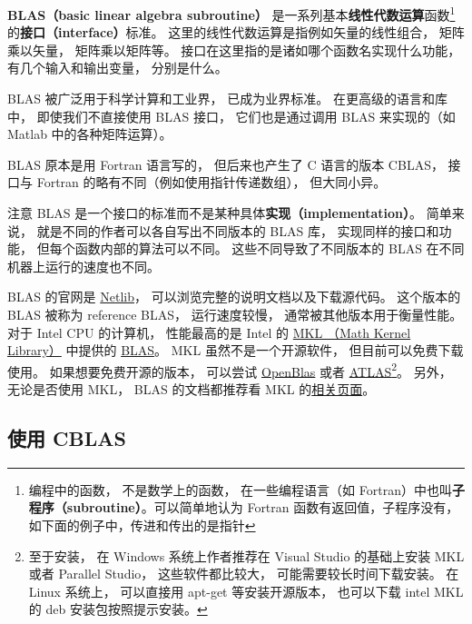 

\textbf{BLAS（basic linear algebra subroutine）} 是一系列基本\textbf{线性代数运算}函数\footnote{编程中的函数， 不是数学上的函数， 在一些编程语言（如 Fortran）中也叫\textbf{子程序（subroutine）}。可以简单地认为 Fortran 函数有返回值，子程序没有，如下面的例子中，传进和传出的是指针}的\textbf{接口（interface）}标准。  这里的线性代数运算是指例如矢量的线性组合， 矩阵乘以矢量， 矩阵乘以矩阵等。 接口在这里指的是诸如哪个函数名实现什么功能， 有几个输入和输出变量， 分别是什么。

BLAS 被广泛用于科学计算和工业界， 已成为业界标准。 在更高级的语言和库中， 即使我们不直接使用 BLAS 接口， 它们也是通过调用 BLAS 来实现的（如 Matlab 中的各种矩阵运算）。

BLAS 原本是用 Fortran 语言写的， 但后来也产生了 C 语言的版本 CBLAS， 接口与 Fortran 的略有不同（例如使用指针传递数组）， 但大同小异。

注意 BLAS 是一个接口的标准而不是某种具体\textbf{实现（implementation）}。 简单来说， 就是不同的作者可以各自写出不同版本的 BLAS 库， 实现同样的接口和功能， 但每个函数内部的算法可以不同。  这些不同导致了不同版本的 BLAS 在不同机器上运行的速度也不同。

BLAS 的官网是 \href{http://www.netlib.org/blas/}{Netlib}， 可以浏览完整的说明文档以及下载源代码。 这个版本的 BLAS 被称为 reference BLAS， 运行速度较慢， 通常被其他版本用于衡量性能。 对于 Intel CPU 的计算机， 性能最高的是 Intel 的 \href{https://software.intel.com/en-us/mkl}{MKL （Math Kernel Library）} 中提供的 \href{https://software.intel.com/en-us/mkl-developer-reference-c-blas-and-sparse-blas-routines}{BLAS}。 MKL 虽然不是一个开源软件， 但目前可以免费下载使用。 如果想要免费开源的版本， 可以尝试 \href{https://www.openblas.net/}{OpenBlas} 或者 \href{https://sourceforge.net/projects/math-atlas/}{ATLAS}\footnote{至于安装， 在 Windows 系统上作者推荐在 Visual Studio 的基础上安装 MKL 或者 Parallel Studio， 这些软件都比较大， 可能需要较长时间下载安装。 在 Linux 系统上， 可以直接用 apt-get 等安装开源版本， 也可以下载 intel MKL 的 deb 安装包按照提示安装。}。 另外， 无论是否使用 MKL， BLAS 的文档都推荐看 MKL 的\href{https://software.intel.com/en-us/mkl-developer-reference-c-blas-and-sparse-blas-routines}{相关页面}。

\subsection{使用 CBLAS}

